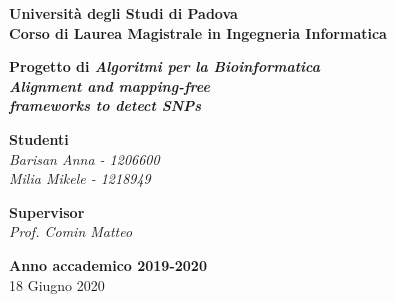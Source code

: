 \documentclass[11pt]{article}
\theoremstyle{definition}
\begin{document}

\begin{titlepage}
   \begin{center}
       	\vspace*{1cm}

	   	\textbf{\Large Università degli Studi di Padova\\}
	   	\vspace{0.2cm}
		\textbf{\Large Corso di Laurea Magistrale in Ingegneria Informatica}

		\vspace{5cm}
		\textbf{\huge Progetto di \textit{Algoritmi per la Bioinformatica}\\}
		\vspace{0.5cm}
      	\textbf{\huge \textit{Alignment and mapping-free \\}}
      	\vspace{0.2cm}
		\textbf{\huge \textit{frameworks to detect SNPs}}     
		 	
       	\vspace{6.3cm}

		\begin{Large}
			\begin{flushright}
				\textbf{Studenti\\}
				\textit{Barisan Anna - 1206600\\ Milia Mikele - 1218949}
			\end{flushright}
		\end{Large}
		
       \begin{Large}
			\begin{flushleft}
				\textbf{Supervisor\\}
				\textit{Prof. Comin Matteo}
			\end{flushleft}
		\end{Large}

       \vfill
       \vspace{0.5cm}
            
       \textbf{Anno accademico 2019-2020}\\
       18 Giugno 2020
            
       
    

\end{center}
\end{titlepage}
\end{document}
